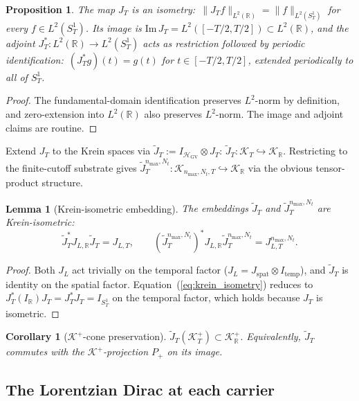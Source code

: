 \documentclass[11pt,a4paper]{article}
\theoremstyle{plain}
\newtheorem{lemma}[theorem]{Lemma}
\newtheorem{proposition}[theorem]{Proposition}
\newtheorem{corollary}[theorem]{Corollary}
\theoremstyle{definition}
\newcommand{\nmax}{n_{\max}}
\newcommand{\Nt}{N_{t}}
\newcommand{\SoneT}{S^{1}_{T}}
\newcommand{\Krein}{\mathcal{K}}
\newcommand{\norm}[1]{\lVert #1 \rVert}
\newcommand{\R}{\mathbb{R}}
\newcommand{\JL}{J_{L}}
\newcommand{\JT}{\widetilde{J}_{T}}
\newcommand{\HGV}{\mathcal{H}_{\mathrm{GV}}}
\newcommand{\Kplus}{\Krein^{+}}
\newcommand{\spat}{\mathrm{spat}}
\newcommand{\temp}{\mathrm{temp}}
\begin{document}
\begin{proposition}\label{prop:JT_isometry}
The map $J_{T}$ is an isometry:\
$\norm{J_{T} f}_{L^{2}(\R)} = \norm{f}_{L^{2}(\SoneT)}$ for every
$f \in L^{2}(\SoneT)$. Its image is
$\mathrm{Im}\,J_{T} = L^{2}([-T/2, T/2]) \subset L^{2}(\R)$, and the
adjoint $J_{T}^{*} : L^{2}(\R) \to L^{2}(\SoneT)$ acts as restriction
followed by periodic identification:\
$(J_{T}^{*} g)(t) = g(t)$ for $t \in [-T/2, T/2]$, extended
periodically to all of $\SoneT$.
\end{proposition}

\begin{proof}
The fundamental-domain identification preserves $L^{2}$-norm by
definition, and zero-extension into $L^{2}(\R)$ also preserves
$L^{2}$-norm. The image and adjoint claims are routine.
\end{proof}

Extend $J_{T}$ to the Krein spaces via
$\JT := I_{\HGV} \otimes J_{T}$:
$\JT : \Krein_{T} \hookrightarrow \Krein_{\R}$. Restricting to the
finite-cutoff substrate gives
$\JT^{\nmax, \Nt} : \Krein_{\nmax, \Nt, T} \hookrightarrow \Krein_{\R}$
via the obvious tensor-product structure.

\begin{lemma}[Krein-isometric embedding]\label{lem:Krein_isometry}
The embeddings $\JT$ and $\JT^{\nmax, \Nt}$ are Krein-isometric:\
\begin{equation}\label{eq:krein_isometry}
\JT^{*} J_{L,\R} \JT = J_{L,T}, \qquad
(\JT^{\nmax, \Nt})^{*} J_{L,\R} \JT^{\nmax, \Nt} = J_{L,T}^{\nmax, \Nt}.
\end{equation}
\end{lemma}

\begin{proof}
Both $\JL$ act trivially on the temporal factor ($\JL = J_{\spat}\otimes
I_{\temp}$), and $\JT$ is identity on the spatial factor.
Equation~(\ref{eq:krein_isometry}) reduces to
$J_{T}^{*} (I_{\R}) J_{T} = J_{T}^{*} J_{T} = I_{\SoneT}$ on the
temporal factor, which holds because $J_{T}$ is isometric.
\end{proof}

\begin{corollary}[$\Kplus$-cone preservation]\label{cor:Kplus_preservation}
$\JT(\Kplus_{T}) \subset \Kplus_{\R}$. Equivalently, $\JT$ commutes
with the $\Kplus$-projection $P_{+}$ on its image.
\end{corollary}

\subsection{The Lorentzian Dirac at each carrier}\label{sec:setup_dirac}
\end{document}
